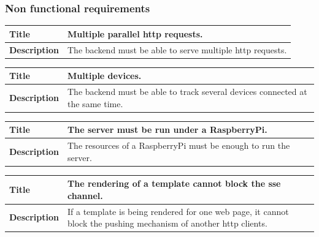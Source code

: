 \documentclass[12pt]{article}
\begin{document}
            \subsubsection{Non functional requirements}
                \begin{tabularx}{\textwidth}{|l|X|}
                    \hline
                    \textbf{Title} & Multiple parallel http requests. \\
                    \hline
                    \textbf{Description} & The backend must be able to serve
                    multiple http requests. \\
                    \hline
                \end{tabularx}

                \begin{tabularx}{\textwidth}{|l|X|}
                    \hline
                    \textbf{Title} & Multiple devices. \\
                    \hline
                    \textbf{Description} & The backend must be able to track
                    several devices connected at the same time. \\
                    \hline
                \end{tabularx}

                \begin{tabularx}{\textwidth}{|l|X|}
                    \hline
                    \textbf{Title} & The server must be run under a RaspberryPi.\\
                    \hline
                    \textbf{Description} & The resources of a RaspberryPi must
                    be enough to run the server. \\
                    \hline
                \end{tabularx}

                \begin{tabularx}{\textwidth}{|l|X|}
                    \hline
                    \textbf{Title} & The rendering of a template cannot block
                    the sse channel. \\
                    \hline
                    \textbf{Description} & If a template is being rendered for
                    one web page, it cannot block the pushing mechanism of
                    another http clients. \\
                    \hline
                \end{tabularx}
\end{document}
